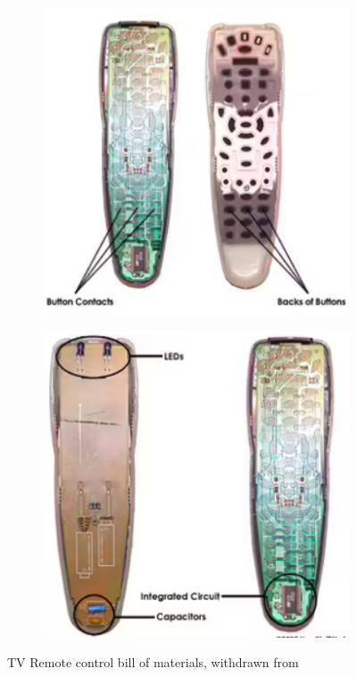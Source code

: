 \begin{figure}[htb!]
  \centering
  \begin{subfigure}{.4\textwidth}
  \includegraphics[width=\textwidth]{img/remotematerial1.png}%
\end{subfigure}
%
  \begin{subfigure}{.4\textwidth}
    \includegraphics[width=\textwidth]{img/remotematerial2.png}%
\end{subfigure}
%
  \caption{TV Remote control bill of materials, withdrawn from~\cite{remotematerial}}%
  \label{fig:remotemat}
\end{figure}


